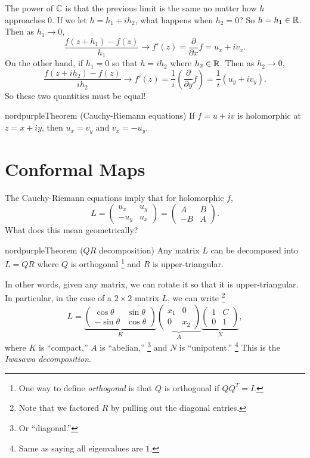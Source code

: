 The power of $\mathbb{C}$ is that the previous limit is the same
no matter how $h$ approaches $0$. If we let
$h = h_1 + ih_2$, what happens when $h_2 = 0$? So
$h = h_1 \in \mathbb{R}$. Then as $h_1 \to 0$,
\[
  \frac{f(z + h_1) - f(z)}{h_1} \to f'(z) = \frac{\partial}{\partial x} f = u_x + iv_x
.\] 
On the other hand, if $h_1 = 0$ so that $h = ih_2$
where $h_2 \in \mathbb{R}$. Then as $h_2 \to 0$,
 \[
   \frac{f(z + ih_2) - f(z)}{ih_2} \to f'(z) = \frac{1}{i}\left(\frac{\partial}{\partial y} f\right) = \frac{1}{i} (u_y + iv_y)
.\]
So these two quantities must be equal!

\begin{mybox}{nordpurple}{Theorem (Cauchy-Riemann equations)}
  If $f = u + iv$ is holomorphic at $z = x + iy$, then
  $u_x = v_y$ and $v_x = -u_y$.
\end{mybox}

\section{Conformal Maps}
The Cauchy-Riemann equations imply that for holomorphic
$f$,
\[
L =
\left(\begin{matrix}
  u_x & u_y \\
  -u_y & u_x
\end{matrix}\right) =
\left(\begin{matrix}
    A & B \\
    -B & A
\end{matrix}\right)
.\]
What does this mean geometrically?

\begin{mybox}{nordpurple}{Theorem ($QR$ decomposition)}
  Any matrix $L$ can be decomposed into $L = QR$ where
  $Q$ is orthogonal
  \footnote{One way to define \textit{orthogonal} is that
    $Q$ is orthogonal if $QQ^T = I$.}
  and $R$ is upper-triangular.
\end{mybox}

In other words, given any matrix, we can rotate it so that
it is upper-triangular. In particular, in the case of a
$2 \times 2$ matrix $L$, we can write
\footnote{Note that we factored $R$ by pulling out the
diagonal entries.}
\[
L =
\underbrace{\left(\begin{matrix}
    \cos \theta & \sin \theta \\
    -\sin \theta & \cos \theta
\end{matrix}\right)}_{K}
\underbrace{\left(\begin{matrix}
    x_1 & 0 \\
    0 & x_2
\end{matrix}\right)}_{A}
\underbrace{\left(\begin{matrix}
    1 & C \\
    0 & 1
\end{matrix}\right)}_{N}
,\]
where $K$ is ``compact,'' $A$ is ``abelian,''
\footnote{Or ``diagonal.''}
and $N$ is ``unipotent.''
\footnote{Same as saying all eigenvalues are $1$.}
This is the \textit{Iwasawa decomposition}.

